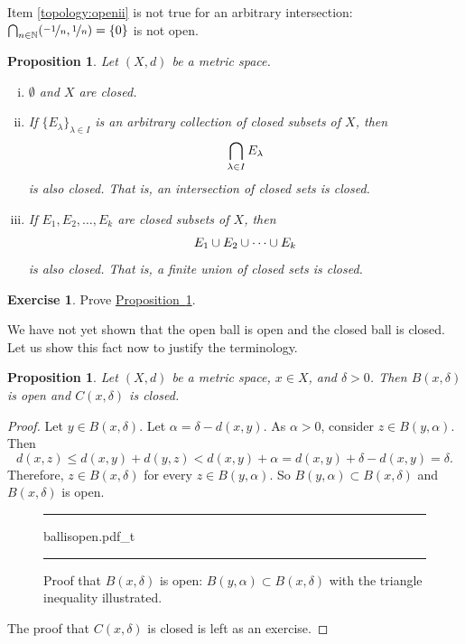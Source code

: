 \documentclass[12pt,openany]{book}
\newcommand{\avoidbreak}{\postdisplaypenalty=100}
\newcommand{\N}{{\mathbb{N}}}
\theoremstyle{plain}
\newtheorem{prop}[thm]{Proposition}
\theoremstyle{remark}
\theoremstyle{definition}
\newenvironment{exbox}{%
    \def\FrameCommand{\vrule width 1pt \relax\hspace{10pt}}%
    \MakeFramed{\advance\hsize-\width\FrameRestore}%
}{%
    \endMakeFramed
}
\newenvironment{myfig}{%
\begin{figure}[h!t]
\noindent\rule{\textwidth}{0.5pt}\vspace{12pt}\par\centering}%
{\par\noindent\rule{\textwidth}{0.5pt}
\end{figure}}
\theoremstyle{exercise}
\newtheorem{exercise}{Exercise}[section]
\theoremstyle{example}
\newcommand{\propref}[1]{\hyperref[#1]{Proposition~\ref*{#1}}}
\begin{document}
Item \ref{topology:openii} is not true for an arbitrary intersection:
$\bigcap_{n \in \N} (\nicefrac{-1}{n},\nicefrac{1}{n}) = \{ 0
\}$ is not open.

\begin{prop} \label{prop:topology:closed}
Let $(X,d)$ be a metric space.
\begin{enumerate}[(i)]
\item \label{topology:closedi} $\emptyset$ and $X$ are closed.
\item \label{topology:closedii} If $\{ E_\lambda \}_{\lambda \in I}$ is
an arbitrary collection of closed subsets of $X$, then
\begin{equation*}
\bigcap_{\lambda \in I} E_\lambda
\avoidbreak
\end{equation*}
is also closed.  That is, an intersection of closed sets is closed.
\item \label{topology:closediii} If $E_1, E_2, \ldots, E_k$ are closed
subsets of $X$, then
\begin{equation*}
E_1 \cup E_2 \cup \cdots \cup E_k
\avoidbreak
\end{equation*}
is also closed.  That is, a finite union of closed sets is closed.
\end{enumerate}
\end{prop}

\begin{exbox}
\begin{exercise}
Prove \propref{prop:topology:closed}.
\end{exercise}
\end{exbox}

We have not yet shown that the open ball is open and the closed ball is
closed.  Let us show this fact now to justify the terminology.

\begin{prop} \label{prop:topology:ballsopenclosed}
Let $(X,d)$ be a metric space, $x \in X$, and $\delta > 0$.  Then
$B(x,\delta)$ is open and 
$C(x,\delta)$ is closed.
\end{prop}

\begin{proof}
Let $y \in B(x,\delta)$.  Let $\alpha = \delta-d(x,y)$.  As $\alpha
> 0$, consider $z \in B(y,\alpha)$.  Then
\begin{equation*}
d(x,z) \leq d(x,y) + d(y,z) < d(x,y) + \alpha = d(x,y) + \delta-d(x,y) =
\delta .
\end{equation*}
Therefore, $z \in B(x,\delta)$ for every $z \in B(y,\alpha)$.  So $B(y,\alpha) \subset B(x,\delta)$ and
$B(x,\delta)$ is open.

\begin{myfig}
{ballisopen.pdf_t}
\caption{Proof that $B(x,\delta)$ is open: $B(y,\alpha) \subset
B(x,\delta)$ with the triangle inequality illustrated.\label{fig:ballisopen}}
\end{myfig}

The proof that $C(x,\delta)$ is closed is left as an exercise.
\end{proof}
\end{document}
